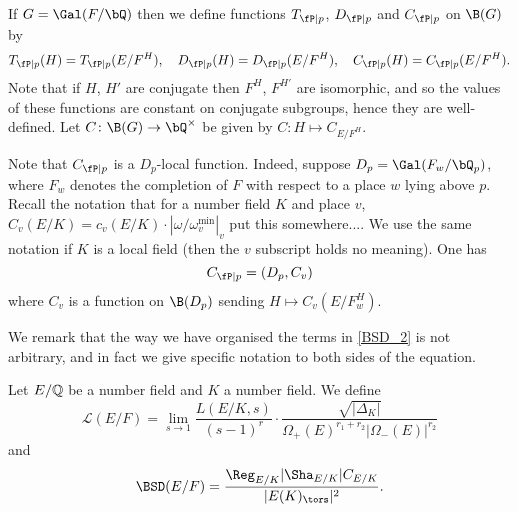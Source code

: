 \begin{notation}\label{not_contr_fns}
    If $G = \Gal(F / \bQ)$ then we define functions $T_{\fP \mid p}$, $D_{\fP \mid p}$ and $C_{\fP \mid p}$ on $\B(G)$ by 
    \[ T_{\fP \mid p}(H) = T_{\fP \mid p}(E / F^H), \quad D_{\fP \mid p}(H) = D_{\fP \mid p}(E / F^H), \quad C_{\fP \mid p}(H) = C_{\fP \mid p}(E / F^H). \]
    Note that if $H$, $H'$ are conjugate then $F^H$, $F^{H'}$ are isomorphic, and so the values of these functions are constant on conjugate subgroups, hence they are well-defined. Let $C \colon \B(G) \to \bQ^{\times}$ be given by $C \colon H \mapsto C_{E / F^H}$.  
    
    Note that $C_{\fP \mid p}$ is a $D_p$-local function. Indeed, suppose $D_p = \Gal(F_w / \bQ_p)$, where $F_w$ denotes the completion of $F$ with respect to a place $w$ lying above $p$. Recall the notation that for a number field $K$ and place $v$, $C_v(E / K) = c_v(E / K) \cdot \left| \omega / \omega_v^{\min} \right|_v$ {\color{red} put this somewhere...}. We use the same notation if $K$ is a local field (then the $v$ subscript holds no meaning).
    One has
    \begin{equation*}
    C_{\fP \mid p} = (D_p, C_v)
    \end{equation*}
    where $C_v$ is a function on $\B(D_p)$ sending $H \mapsto C_v(E / F_w^H)$.

\end{notation}


We remark that the way we have organised the terms in \eqref{BSD_2} is not arbitrary, and in fact we give specific notation to both sides of the equation. 

\begin{notation}
    Let $E/\mathbb{Q}$ be a number field and $K$ a number field. We define 
    $$\mathcal{L}(E/F)=\lim_{s\to1}\frac{L(E/K,s)}{(s-1)^r}\cdot\frac{\sqrt{|\Delta_K|}}{\Omega_+(E)^{r_1+r_2}|\Omega_-(E)|^{r_2}}$$
    and
    $$\BSD(E/F)=\frac{\Reg_{E/K}|\Sha_{E/K}|C_{E/K}}{|E(K)_{\tors}|^2}.$$
\end{notation}


